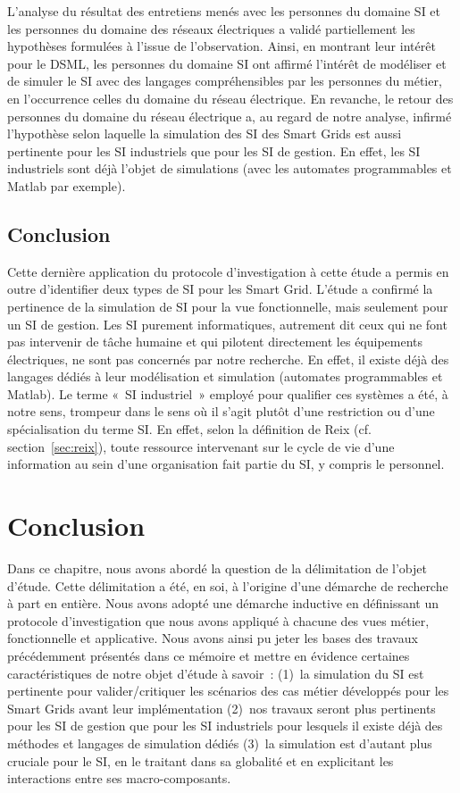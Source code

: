 L'analyse du résultat des entretiens menés avec les personnes du domaine SI et
les personnes du domaine des réseaux électriques a validé partiellement les
hypothèses formulées à l'issue de l'observation. Ainsi, en montrant leur intérêt
pour le DSML, les personnes du domaine SI ont affirmé l'intérêt de modéliser et
de simuler le SI avec des langages compréhensibles par les personnes du métier,
en l'occurrence celles du domaine du réseau électrique.  En revanche, le retour
des personnes du domaine du réseau électrique a, au regard de notre analyse,
infirmé l'hypothèse selon laquelle la simulation des SI des Smart Grids est aussi
pertinente pour les SI industriels que pour les SI de gestion. En effet, les SI
industriels sont déjà l'objet de simulations (avec les automates programmables
et Matlab par exemple).

\subsection{Conclusion}
Cette dernière application du protocole
d'investigation à cette étude a permis en outre d'identifier deux types de SI
pour les Smart Grid. L'étude a confirmé la pertinence de la simulation de SI
pour la vue fonctionnelle, mais seulement pour un SI de gestion. Les SI purement
informatiques, autrement dit ceux qui ne font pas intervenir de tâche humaine et
qui pilotent directement les équipements électriques, ne sont pas concernés par
notre recherche. En effet, il existe déjà des langages dédiés à leur
modélisation et simulation (automates programmables et Matlab). Le terme «~SI
industriel~» employé pour qualifier ces systèmes a été, à notre sens, trompeur
dans le sens où il s'agit plutôt d'une restriction ou d'une spécialisation du
terme SI. En effet, selon la définition de Reix (cf. section~\ref{sec:reix}),
toute ressource intervenant sur le cycle de vie d'une information au sein d'une
organisation fait partie du SI, y compris le personnel.
	


\section{Conclusion}

Dans ce chapitre, nous avons abordé la question de la délimitation de l'objet d'étude.
Cette délimitation a été, en soi, à l'origine d'une démarche de recherche à part en entière.
Nous avons adopté une démarche inductive en définissant un protocole d'investigation que nous
avons appliqué à chacune des vues métier, fonctionnelle et applicative.
Nous avons ainsi pu jeter les bases des travaux précédemment présentés dans ce mémoire et 
mettre en évidence certaines caractéristiques de notre objet d'étude à savoir~:
(1)~la simulation du SI est pertinente pour valider/critiquer les scénarios des cas métier développés pour
les Smart Grids avant leur implémentation (2)~nos travaux seront plus pertinents pour les SI de
gestion que pour les SI industriels pour lesquels il existe déjà des méthodes et langages de simulation dédiés
(3)~la simulation est d'autant plus cruciale pour le SI, en le traitant dans sa globalité et en explicitant les interactions
entre ses macro-composants. 


